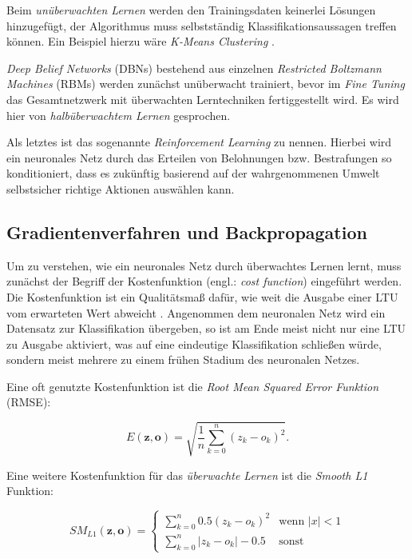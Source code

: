 Beim \textit{unüberwachten Lernen} werden den Trainingsdaten keinerlei Lösungen hinzugefügt, der Algorithmus muss selbstständig Klassifikationsaussagen treffen können. Ein Beispiel hierzu wäre \textit{K-Means Clustering} \cite{AurelienGeron.2018}. 

\textit{Deep Belief Networks} (DBNs) bestehend aus einzelnen \textit{Restricted Boltzmann Machines} (RBMs) werden zunächst unüberwacht trainiert, bevor im \textit{Fine Tuning} das Gesamtnetzwerk mit überwachten Lerntechniken fertiggestellt wird. Es wird hier von \textit{halbüberwachtem Lernen} gesprochen.

Als letztes ist das sogenannte \textit{Reinforcement Learning} zu nennen. Hierbei wird ein neuronales Netz durch das Erteilen von Belohnungen bzw. Bestrafungen so konditioniert, dass es zukünftig basierend auf der wahrgenommenen Umwelt selbstsicher richtige Aktionen auswählen kann.

\subsection*{Gradientenverfahren und Backpropagation}

Um zu verstehen, wie ein neuronales Netz durch überwachtes Lernen \glqq lernt\grqq{}, muss zunächst der Begriff der Kostenfunktion (engl.: \textit{cost function}) eingeführt werden. Die Kostenfunktion ist ein Qualitätsmaß dafür, wie weit die Ausgabe einer LTU vom erwarteten Wert abweicht \cite{AurelienGeron.2018}. Angenommen dem neuronalen Netz wird ein Datensatz zur Klassifikation übergeben, so ist am Ende meist nicht nur eine LTU zu Ausgabe aktiviert, was auf eine eindeutige Klassifikation schließen würde, sondern meist mehrere zu einem frühen Stadium des neuronalen Netzes.

Eine oft genutzte Kostenfunktion ist die \textit{Root Mean Squared Error Funktion} (RMSE):

\begin{equation} \label{mse}
E(\boldsymbol{z},\boldsymbol{o}) = \sqrt{\frac{1}{n}\sum_{k=0}^n (z_k-o_k)^2}.
\end{equation}

Eine weitere Kostenfunktion für das \textit{überwachte Lernen} ist die \textit{Smooth L1} Funktion:

\begin{equation} \label{smooth}
SM_{L1}(\boldsymbol{z},\boldsymbol{o}) = \begin{cases}
\sum_{k=0}^n 0.5(z_k-o_k)^2      & \text{wenn } |x| < 1\\
\sum_{k=0}^n |z_k-o_k| - 0.5   & \text{sonst}
\end{cases}
\end{equation}

